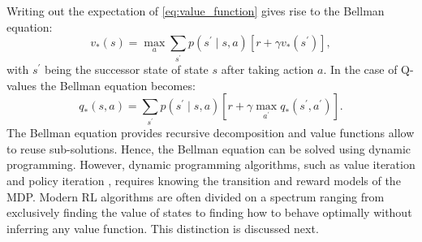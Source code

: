 \documentclass[\home/main.tex]{subfiles}
\begin{document}
Writing out the expectation of \cref{eq:value_function} gives rise to the Bellman equation:
\begin{equation}
	v_{*}(s)=\max _{a} \sum_{s^{\prime}} p\left(s^{\prime} \mid s, a\right)\left[r+\gamma v_{*}\left(s^{\prime}\right)\right],
\end{equation}
with $s^{\prime}$ being the successor state of state $s$ after taking action $a$. In the case of Q-values the Bellman equation becomes:
\begin{equation}
	q_{*}(s, a)=\sum_{s^{\prime}} p\left(s^{\prime} \mid s, a\right)\left[r+\gamma \max _{a^{\prime}} q_{*}\left(s^{\prime}, a^{\prime}\right)\right].
\end{equation}
The Bellman equation provides recursive decomposition and value functions allow to reuse sub-solutions. Hence, the Bellman equation can be solved using dynamic programming. However, dynamic programming algorithms, such as value iteration and policy iteration \autocite{Sutton2018}, requires knowing the transition and reward models of the MDP. Modern RL algorithms are often divided on a spectrum ranging from exclusively finding the value of states to finding how to behave optimally without inferring any value function. This distinction is discussed next.
\end{document}
